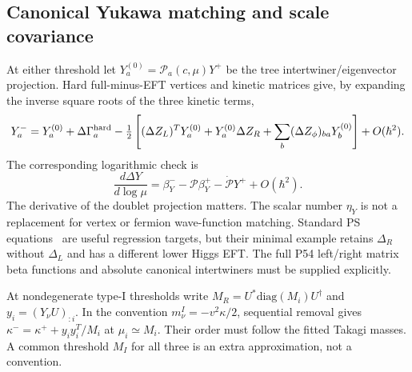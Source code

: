\documentclass[11pt]{article}
\begin{document}
\subsection{Canonical Yukawa matching and scale covariance}
At either threshold let $Y_a^{(0)}=\mathcal P_a(c,\mu)Y^+$ be the
tree intertwiner/eigenvector projection. Hard full-minus-EFT vertices and
kinetic matrices give, by expanding the inverse square roots of the three
kinetic terms,
\begin{equation}
 Y_a^-=Y_a^{(0)}+\Delta\Gamma_a^{\rm hard}
 -\tfrac12\left[(\Delta Z_L)^T Y_a^{(0)}+Y_a^{(0)}\Delta Z_R
 +\sum_b(\Delta Z_\phi)_{ba}Y_b^{(0)}\right]+O(\hbar^2).
\end{equation}
The corresponding logarithmic check is
\begin{equation}
 \frac{d\Delta Y}{d\log\mu}=\beta_Y^-
 -\mathcal P\beta_Y^+-\dot{\mathcal P}Y^++O(\hbar^2).
\end{equation}
The derivative of the doublet projection matters. The scalar number
$\eta_Y$ is not a replacement for vertex or fermion wave-function
matching. Standard PS equations~\cite{MOR} are useful regression targets,
but their minimal example retains $\Delta_R$ without $\Delta_L$ and has a
different lower Higgs EFT. The full P54 left/right matrix beta functions
and absolute canonical intertwiners must be supplied explicitly.

At nondegenerate type-I thresholds write
$M_R=U^*\mathrm{diag}(M_i)U^\dagger$ and $y_i=(Y_\nu U)_{:i}$. In the
convention $m_\nu^I=-v^2\kappa/2$, sequential removal gives
$\kappa^- =\kappa^++y_iy_i^T/M_i$ at $\mu_i\simeq M_i$. Their order must
follow the fitted Takagi masses. A common threshold $M_I$ for all three is
an extra approximation, not a convention.
\end{document}
